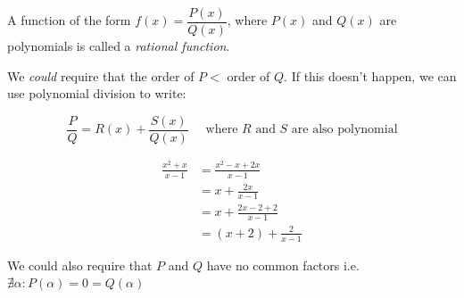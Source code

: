 \documentclass[10pt]{scrartcl}
\begin{document}
\begin{itemize}
\begin{minipage}{5cm}

  \begin{center}
\end{center}

\end{minipage}
\begin{minipage}{5cm}
	
	
  \begin{center}
\end{center}


\end{minipage}



\end{itemize}

\vspace*{5pt}

\begin{definition}A function   of the form $f(x) = \dfrac{P(x)}{Q(x)}$, where $P(x)$ and $Q(x)$ are polynomials is called a \emph{rational function}.
\end{definition}

We \textit{could} require that the order of $P < $ order of $Q$. If this doesn't happen, we can use polynomial division to write: 

\[\frac{P}{Q} = R(x) + \frac{S(x)}{Q(x)} \quad \text{ where } R \text{ and } S \text{ are also polynomial}\]\vspace*{5pt}

\begin{example}
\[\begin{aligned}
\frac{x^2 + x}{x -1} &= \frac{x^2 - x + 2x}{x-1}\\
&= x + \frac{2x}{x-1}\\
&= x + \frac{2x-2+2}{x-1}\\
&= (x+2) + \frac{2}{x-1} \end{aligned} \]
\end{example}
We could also require that $P$ and $Q$ have no common factors i.e. $\nexists \alpha : P(\alpha) = 0 = Q(\alpha)$ 
\end{document}
